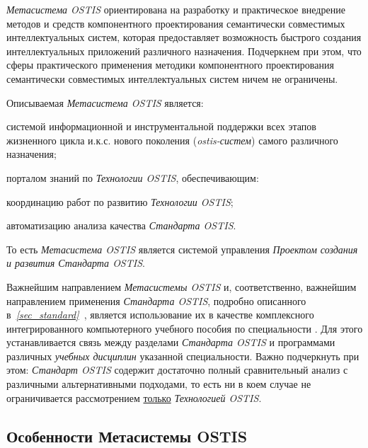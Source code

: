 \textit{Метасистема OSTIS} ориентирована на разработку и практическое внедрение методов и средств компонентного проектирования семантически совместимых интеллектуальных систем, которая предоставляет возможность быстрого создания интеллектуальных приложений различного назначения. Подчеркнем при этом, что сферы практического применения методики компонентного проектирования семантически совместимых интеллектуальных систем ничем не ограничены.

Описываемая \textit{Метасистема OSTIS} является:

\begin{textitemize}
	\item системой информационной и инструментальной поддержки всех этапов жизненного цикла и.к.с. нового поколения (\textit{ostis-систем}) самого различного назначения;
	\item порталом знаний по \textit{Технологии OSTIS}, обеспечивающим:
		\begin{textitemize}
			\item координацию работ по развитию \textit{Технологии OSTIS};
			\item автоматизацию анализа качества \textit{Стандарта OSTIS}.
		\end{textitemize}
	То есть \textit{Метасистема OSTIS} является системой управления \textit{Проектом создания и развития Стандарта OSTIS}.	
\end{textitemize}

Важнейшим направлением \textit{Метасистемы OSTIS} и, соответственно, важнейшим направлением применения \textit{Стандарта OSTIS}, подробно описанного в~\textit{\ref{sec_standard}~}, является использование их в качестве комплексного интегрированного компьютерного учебного пособия по специальности . Для этого устанавливается связь между разделами \textit{Стандарта OSTIS} и программами различных \textit{учебных дисциплин} указанной специальности. Важно подчеркнуть при этом: \textit{Стандарт OSTIS} содержит достаточно полный сравнительный анализ с различными альтернативными подходами, то есть ни в коем случае не ограничивается рассмотрением \uline{только} \textit{Технологией OSTIS}.

\subsection{Особенности Метасистемы OSTIS}
\label{ims_peculiarities}

